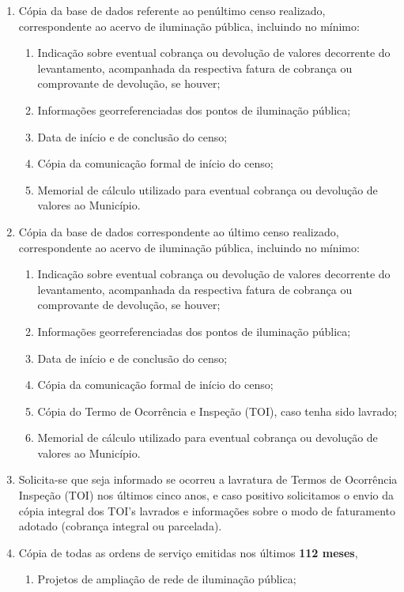 \begin{enumerate}[resume]
  \item Cópia da base de dados referente ao penúltimo censo realizado, correspondente ao acervo de iluminação pública, incluindo no mínimo:
  \begin{enumerate}
    \item Indicação sobre eventual cobrança ou devolução de valores decorrente do levantamento, acompanhada da respectiva fatura de cobrança ou comprovante de devolução, se houver;
    \item Informações georreferenciadas dos pontos de iluminação pública;
    \item Data de início e de conclusão do censo;
    \item Cópia da comunicação formal de início do censo;
    \item Memorial de cálculo utilizado para eventual cobrança ou devolução de valores ao Município.
  \end{enumerate}
  \item Cópia da base de dados correspondente ao último censo realizado, correspondente ao acervo de iluminação pública, incluindo no mínimo:
  \begin{enumerate}
    \item Indicação sobre eventual cobrança ou devolução de valores decorrente do levantamento, acompanhada da respectiva fatura de cobrança ou comprovante de devolução, se houver;
    \item Informações georreferenciadas dos pontos de iluminação pública;
    \item Data de início e de conclusão do censo;
    \item Cópia da comunicação formal de início do censo;
    \item Cópia do Termo de Ocorrência e Inspeção (TOI), caso tenha sido lavrado;
    \item Memorial de cálculo utilizado para eventual cobrança ou devolução de valores ao Município.
  \end{enumerate}
  \item Solicita-se que seja informado se ocorreu a lavratura de Termos de Ocorrência Inspeção (TOI) nos últimos cinco anos, e caso positivo solicitamos o envio da cópia integral dos TOI’s lavrados e informações sobre o modo de faturamento adotado (cobrança integral ou parcelada).
  \item Cópia de todas as ordens de serviço emitidas nos últimos \textbf{112 meses},
  \begin{enumerate}
    \item Projetos de ampliação de rede de iluminação pública;
  \end{enumerate}
\end{enumerate}




